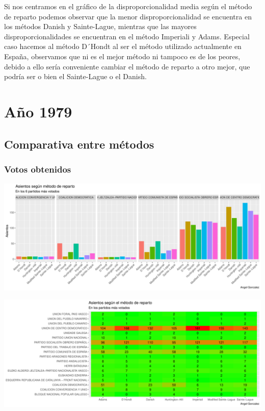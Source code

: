 \documentclass[12pt,a4paper,]{book}
\numberwithin{dummy}{section}
\theoremstyle{ocrenumbox}
\theoremstyle{blacknumex}
\theoremstyle{blacknumbox}
\theoremstyle{ocrenum}
\theoremstyle{ocrenum}
\begin{document}
Si nos centramos en el gráfico de la disproporcionalidad media según el
método de reparto podemos observar que la menor disproporcionalidad se
encuentra en los métodos Danish y Sainte-Lague, mientras que las mayores
disproporcionalidades se encuentran en el método Imperiali y Adams.
Especial caso hacemos al método D´Hondt al ser el método utilizado
actualmente en España, observamos que ni es el mejor método ni tampoco
es de los peores, debido a ello sería conveniente cambiar el método de
reparto a otro mejor, que podría ser o bien el Sainte-Lague o el Danish.

\hypertarget{auxf1o-1979}{%
\section{Año 1979}\label{auxf1o-1979}}

\hypertarget{comparativa-entre-muxe9todos-1}{%
\subsection{Comparativa entre
métodos}\label{comparativa-entre-muxe9todos-1}}

\hypertarget{votos-obtenidos-1}{%
\subsubsection{Votos obtenidos}\label{votos-obtenidos-1}}

\begin{center}\includegraphics[width=0.95\linewidth]{figurasR/unnamed-chunk-68-1} \end{center}

\begin{center}\includegraphics[width=0.95\linewidth]{figurasR/unnamed-chunk-68-2} \end{center}
\end{document}
